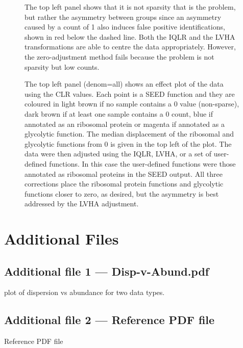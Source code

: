 \documentclass{bmcart}
\def\texttt{[image: ]}
\begin{document}
\begin{backmatter}
\begin{figure}[!t]
\caption{ The top left panel shows that it is not sparsity that is the problem, but rather the asymmetry  between groups since an asymmetry caused by a count of 1 also induces false positive identifications, shown in red below the dashed line. Both the IQLR and the LVHA transformations are able to centre the data appropriately. However, the zero-adjustment method fails because the problem is not sparsity but low counts.}
\label{Fig:ones}
\end{figure}

\begin{figure}[h!]
\caption{  The top left panel (denom=all) shows an effect plot of the data using the CLR values. Each point is a SEED function \cite{Mitra:2011,Macklaim:2018aa} and they are coloured in light brown if no sample contains a 0 value (non-sparse), dark brown if at least one sample contains a 0 count, blue if annotated as an ribosomal protein or magenta if annotated as a glycolytic function. The median displacement of the ribosomal and glycolytic functions from 0 is given in the top left of the plot. The data were then adjusted using the IQLR, LVHA, or a set of user-defined functions. In this case the user-defined functions were those annotated as ribosomal proteins in the SEED output. All three corrections place the ribosomal protein functions and glycolytic functions closer to zero, as desired, but the asymmetry is best addressed by the LVHA  adjustment.  }
\label{Fig:bv}
\end{figure}


\section*{Additional Files}
  \subsection*{Additional file 1 --- Disp-v-Abund.pdf}
    plot of dispersion vs abundance for two data types. 

  \subsection*{Additional file 2 --- Reference PDF file}
    Reference PDF file


\end{backmatter}
\end{document}

